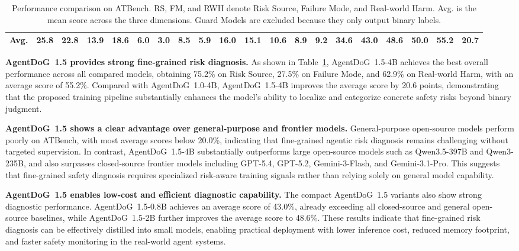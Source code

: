 \documentclass{llmxive}
\providecommand{\scoreBest}[1]{\cellcolor{green!35}\textbf{#1}}
\providecommand{\scoreHigh}[1]{\cellcolor{green!20}#1}
\providecommand{\scoreGood}[1]{\cellcolor{green!8}#1}
\providecommand{\scoreMid}[1]{\cellcolor{yellow!18}#1}
\providecommand{\scoreLow}[1]{\cellcolor{orange!18}#1}
\providecommand{\scoreWorst}[1]{\cellcolor{red!20}#1}
\providecommand{\agentdog}{AgentDoG~1.5\xspace}
\begin{document}
\begin{table}[t]
{\begin{tabular}{l|cccc|ccccccccc|cccccc}
\midrule
Avg.
& 25.8 & 22.8 & 13.9 & 18.6
& \scoreLow{6.0} & \scoreWorst{3.0} & \scoreLow{8.5} & \scoreWorst{5.9} & \scoreGood{16.0} & \scoreMid{15.1} & \scoreMid{10.6} & \scoreLow{8.9} & \scoreMid{9.2}
& \scoreGood{34.6} & \scoreHigh{43.0} & \scoreHigh{48.6} & \scoreHigh{50.0} & \scoreBest{55.2} & 20.7 \\

\bottomrule
\end{tabular}%
}
\vspace{-10.5pt}
\caption{Performance comparison on ATBench. RS, FM, and RWH denote Risk Source, Failure Mode, and Real-world Harm. Avg. is the mean score across the three dimensions. Guard Models are excluded because they only output binary labels.}
\label{tab:atbench_f}
\end{table}
\endgroup


\textbf{\agentdog{} provides strong fine-grained risk diagnosis.}
    As shown in Table~\ref{tab:atbench_f}, \agentdog{}-4B achieves the best overall performance across all compared
    models, obtaining 75.2\% on Risk Source, 27.5\% on Failure Mode, and 62.9\% on
    Real-world Harm, with an average score of 55.2\%. Compared with
    AgentDoG~1.0-4B, \agentdog{}-4B improves the average score by 20.6
    points, demonstrating that the proposed training pipeline substantially
    enhances the model's ability to localize and categorize concrete safety
    risks beyond binary judgment.

\textbf{\agentdog{} shows a clear advantage over general-purpose and frontier models.}
    General-purpose open-source models perform poorly on ATBench, with most
    average scores below 20.0\%, indicating that fine-grained agentic risk
    diagnosis remains challenging without targeted supervision. In contrast,
    \agentdog{}-4B substantially outperforms large open-source models such
    as Qwen3.5-397B and Qwen3-235B, and also surpasses closed-source frontier
    models including GPT-5.4, GPT-5.2, Gemini-3-Flash, and Gemini-3.1-Pro.
    This suggests that fine-grained safety diagnosis requires specialized
    risk-aware training signals rather than relying solely on general model
    capability.

\textbf{\agentdog{} enables low-cost and efficient diagnostic capability.}
    The compact \agentdog{} variants also show strong diagnostic performance.
    \agentdog{}-0.8B achieves an average score of 43.0\%, already exceeding
    all closed-source and general open-source baselines, while
    \agentdog{}-2B further improves the average score to 48.6\%. These results
    indicate that fine-grained risk diagnosis can be effectively distilled
    into small models, enabling practical deployment with lower inference
    cost, reduced memory footprint, and faster safety monitoring in the real-world
    agent systems.
\end{document}
